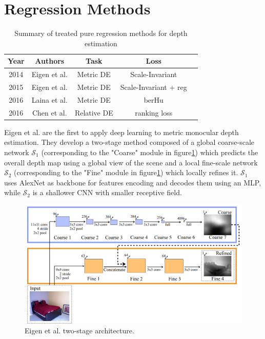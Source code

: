\section{Regression Methods}
\begin{center}
\begin{table}[h!]
\begin{tabular}{| c | c | c | c | c |}
\hline
\textbf{Year} & \textbf{Authors} & \textbf{Task} & \textbf{Loss} \\
\hline
2014 & Eigen et al. \cite{Eigen} & Metric DE & Scale-Invariant\\
2015 & Eigen et al. \cite{Eigen2} & Metric DE & Scale-Invariant + reg\\
2016 & Laina et al. \cite{Laina} & Metric DE & berHu\\
2016 & Chen et al. \cite{DIW} & Relative DE & ranking loss\\
\hline
\end{tabular}
\caption{Summary of treated pure regression methods for depth estimation}
\label{table:1}
\end{table}
\end{center}

Eigen et al. \cite{Eigen} are the first to apply deep learning to metric monocular depth estimation.
They develop a two-stage method composed of a global coarse-scale network $\mathcal{S}_{1}$ (corresponding to the "Coarse" module in figure\ref{fig:Eigen}) which predicts the overall depth map using a global view of the scene and a local fine-scale network $\mathcal{S}_{2}$ (corresponding to the "Fine" module in figure\ref{fig:Eigen}) which locally refines it.
$\mathcal{S}_{1}$ uses AlexNet \cite{AlexNet} as backbone for features encoding and decodes them using an MLP, while $\mathcal{S}_{2}$ is a shallower CNN with smaller receptive field.

\begin{figure}
\centering
\includegraphics[width=1.\textwidth]{figs/Eigen}
\caption{Eigen et al. \cite{Eigen} two-stage architecture. \label{fig:Eigen}}
\end{figure}

